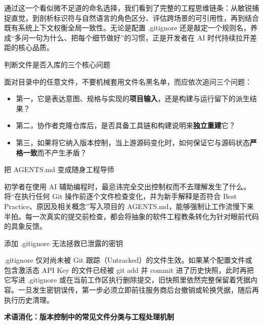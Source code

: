 \documentclass[UTF8,a4paper,11pt,fontset=fandol]{ctexart}
\begin{document}
通过这一个看似微不足道的命名选择，我们看到了完整的工程思维链条：从敏锐捕捉直觉，到剖析标识符与自然语言的角色区分、评估跨场景的可引用性，再到结合既有系统上下文权衡全局一致性。无论是配置 .gitignore 还是敲定一个规则名，养成“多问一句为什么、把每个细节做好”的习惯，正是开发者在 AI 时代持续拉开差距的核心品质。

\begin{importantbox}{判断文件是否入库的三个核心问题}

面对目录中的任意文件，不要机械套用文件名黑名单，而应依次追问三个问题：

\begin{itemize}
\item 第一，它是表达意图、规格与实现的\textbf{项目输入}，还是构建与运行留下的派生结果？

\item 第二，协作者克隆仓库后，是否具备工具链和构建说明来\textbf{独立重建}它？

\item 第三，如果将它纳入版本控制，当上游源码变化时，如何保证它与源码状态\textbf{严格一致}而不产生矛盾？
\end{itemize}

\end{importantbox}

\begin{knowledgebox}{把 AGENTS.md 变成随身工程导师}

初学者在使用 AI 辅助编程时，最忌讳完全交出控制权而不去理解发生了什么。将“在执行任何 Git 操作前逐个文件检查变化，并为新手解释是否符合 Best Practice、原因及相关概念”写入项目的 AGENTS.md，能够强制让工作流慢下来半拍。每一次真实的提交前检查，都会将抽象的软件工程教条转化为针对眼前代码的具象反馈。

\end{knowledgebox}

\begin{warningbox}{添加 .gitignore 无法拯救已泄露的密钥}

.gitignore 仅对尚未被 Git 跟踪（Untracked）的文件生效。如果某个配置文件或包含激活态 API Key 的文件已经被 git add 并 commit 进了历史快照，此时再把它写进 .gitignore 或在当前工作区执行删除提交，旧快照里依然完整保留着凭据内容。一旦发生密钥误传，第一步必须立即前往服务商后台撤销或轮换凭据，随后再执行历史清理。

\end{warningbox}

\par{}\textbf{术语消化：版本控制中的常见文件分类与工程处理机制}
\end{document}
